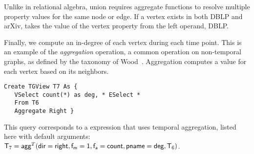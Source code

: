 Unlike in relational algebra, \tga union requires aggregate functions
to resolve multiple property values for the same node or edge.  If a
vertex exists in both DBLP and arXiv,  takes the value of
the vertex property  from the left operand, DBLP.

\begin{example}
\label{ex:agg}
\vspace{-0.1cm}

Finally, we compute an in-degree of each vertex during each time
point.  This is an example of the {\em aggregation} operation, a
common operation on non-temporal graphs, as defined by the taxonomy of
Wood~\cite{Wood2012}.  Aggregation computes a value for each vertex
based on its neighbors.

\begin{small} 
\begin{verbatim}
Create TGView T7 As { 
   VSelect count(*) as deg, * ESelect *
   From T6
   Aggregate Right }
\end{verbatim}
\vspace{-0.1cm}
\end{small}

This query corresponds to a \tga expression that uses temporal
aggregation, listed here with default arguments: $\mathsf{T}_7 =
\textsf{agg}^T(\mathsf{dir=right},\mathsf{f_m=1},\mathsf{f_a=count},\mathsf{pname=deg},\mathsf{T}_6)$.

\vspace{-0.1cm}
\end{example}



